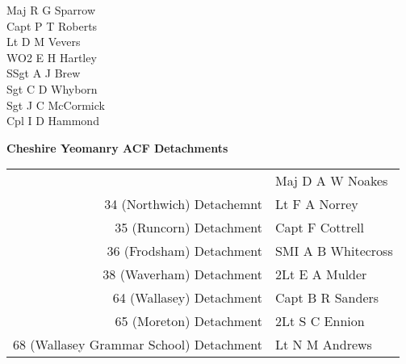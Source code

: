 \begin{multicols}{2}
  \small
  \noindent
  Maj R G Sparrow \\
  Capt P T Roberts \\
  Lt D M Vevers \\
  WO2 E H Hartley \\
  SSgt A J Brew \\
  Sgt C D Whyborn \\
  Sgt J C McCormick \\
  Cpl I D Hammond \\
\end{multicols}

\pagebreak

\vspace*{30mm}

\begin{center}
  \Large
  \textbf{Cheshire Yeomanry ACF Detachments}
\end{center}

\begin{center}
  \begin{tabular}{rl}
    & Maj D A W Noakes \\
    34 (Northwich) Detachemnt & Lt F A Norrey \\
    35 (Runcorn) Detachment & Capt F Cottrell \\
    36 (Frodsham) Detachment & SMI A B Whitecross \\
    38 (Waverham) Detachment & 2Lt E A Mulder \\
    64 (Wallasey) Detachment & Capt B R Sanders \\
    65 (Moreton) Detachment & 2Lt S C Ennion \\
    68 (Wallasey Grammar School) Detachment & Lt N M Andrews \\
  \end{tabular}
\end{center}
